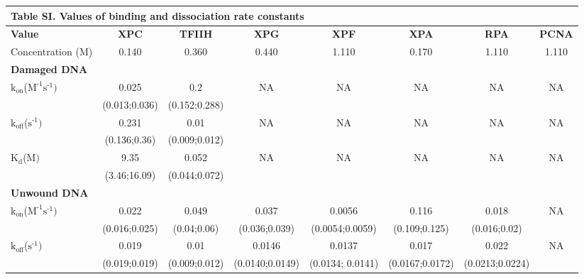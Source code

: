 \begin{table}[H]
	
	\tiny
	\begin{tabular}{lccccccc}
		
		\multicolumn{8}{l}{Table SI. \textbf{Values of binding and dissociation rate constants}} \\
		\hline
		\textbf{Value}    & \textbf{ XPC} & \textbf{TFIIH} & \textbf{XPG} & \textbf{XPF} & \textbf{XPA} & \textbf{RPA} & \textbf{PCNA}  \\
		\hline
		Concentration ({\textmu}M)                                                                        &0.140    & 0.360 & 0.440& 1.110& 0.170& 1.110& 1.110     \\
		\multicolumn{8}{l}{\textbf{Damaged DNA}} \\
		$\text{k}_{\text{on}}$({\textmu}$\text{M}^{\text{-1}}\text{s}^{\text{-1}})$& 0.025               & 0.2  & NA &NA&NA&NA&NA     \\
		& (0.013;0.036)     & (0.152;0.288)  &&&&&   \\
		$\text{k}_{\text{off}}$($\text{s}^{\text{-1}})$                                             & 0.231                & 0.01 & NA &NA&NA&NA&NA     \\
		& (0.136;0.36)     &(0.009;0.012)  &&&&&   \\
		$\text{K}_{\text{d}}$({\textmu}$\text{M})$                                                  & 9.35                & 0.052  & NA &NA&NA&NA&NA     \\
		& (3.46;16.09)     &(0.044;0.072)  &&&&&   \\
		\multicolumn{8}{l}{\textbf{Unwound DNA}} \\
		$\text{k}_{\text{on}}$({\textmu}$\text{M}^{\text{-1}}\text{s}^{\text{-1}})$    & 0.022                     & 0.049                   & 0.037                 &  0.0056             & 0.116                   &0.018                    & NA    \\
		& (0.016;0.025)     & (0.04;0.06)   					&(0.036;0.039) 		 & (0.0054;0.0059)&(0.109;0.125)    &(0.016;0.02)    &     \\
		$\text{k}_{\text{off}}$($\text{s}^{\text{-1}})$                                             & 0.019                     & 0.01                   & 0.0146               & 0.0137                & 0.017                   & 0.022                   &NA     \\
		& (0.019;0.019)     & (0.009;0.012)             & (0.0140;0.0149)&(0.0134; 0.0141)&(0.0167;0.0172)     &  (0.0213;0.0224)  &   \\

\end{tabular}
\end{table}

